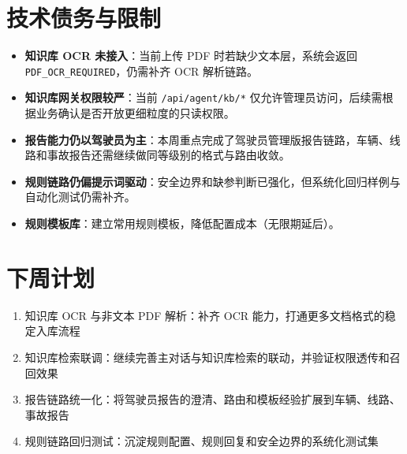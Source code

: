 \documentclass[UTF8]{ctexart}
\begin{document}
\section{技术债务与限制}

\begin{itemize}
\item \textbf{知识库 OCR 未接入}：当前上传 PDF 时若缺少文本层，系统会返回 \texttt{PDF\_OCR\_REQUIRED}，仍需补齐 OCR 解析链路。
\item \textbf{知识库网关权限较严}：当前 \texttt{/api/agent/kb/*} 仅允许管理员访问，后续需根据业务确认是否开放更细粒度的只读权限。
\item \textbf{报告能力仍以驾驶员为主}：本周重点完成了驾驶员管理版报告链路，车辆、线路和事故报告还需继续做同等级别的格式与路由收敛。
\item \textbf{规则链路仍偏提示词驱动}：安全边界和缺参判断已强化，但系统化回归样例与自动化测试仍需补齐。
\item \textbf{规则模板库}：建立常用规则模板，降低配置成本（无限期延后）。
\end{itemize}

\section{下周计划}

\begin{enumerate}
\item 知识库 OCR 与非文本 PDF 解析：补齐 OCR 能力，打通更多文档格式的稳定入库流程
\item 知识库检索联调：继续完善主对话与知识库检索的联动，并验证权限透传和召回效果
\item 报告链路统一化：将驾驶员报告的澄清、路由和模板经验扩展到车辆、线路、事故报告
\item 规则链路回归测试：沉淀规则配置、规则回复和安全边界的系统化测试集
\end{enumerate}
\end{document}
